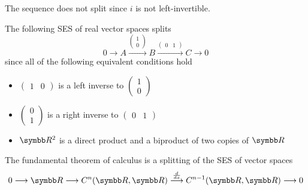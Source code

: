 \begin{example}
\begin{defenum}
    The sequence does not split since \( i \) is not left-invertible.

     The following SES of real vector spaces splits
    \begin{equation*}
      0
      \longrightarrow
      A
      \overset {\left(\begin{smallmatrix}1 \\ 0\end{smallmatrix}\right)} \longrightarrow
      B
      \overset {\left(\begin{smallmatrix}0 & 1\end{smallmatrix}\right)} \longrightarrow
      C
      \longrightarrow
      0
    \end{equation*}
    since all of the following equivalent conditions hold
    \begin{itemize}
      \item \( \left(\begin{smallmatrix}1 & 0\end{smallmatrix}\right) \) is a left inverse to \( \left(\begin{smallmatrix}1 \\ 0\end{smallmatrix}\right) \)
      \item \( \left(\begin{smallmatrix}0 \\ 1\end{smallmatrix}\right) \) is a right inverse to \( \left(\begin{smallmatrix}0 & 1\end{smallmatrix}\right) \)
      \item \( \BB{R}^2 \) is a direct product and a biproduct of two copies of \( \BB{R} \)
    \end{itemize}

     The fundamental theorem of calculus is a splitting of the SES of vector spaces
    \begin{equation*}
      0
      \longrightarrow
      \BB{R}
      \longrightarrow
      C^n(\BB{R}, \BB{R})
      \overset {\frac d {dx}} \longrightarrow
      C^{n-1}(\BB{R}, \BB{R})
      \longrightarrow
      0
    \end{equation*}
  \end{defenum}
\end{example}

